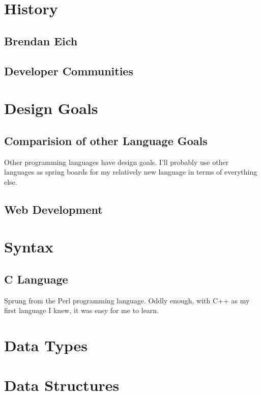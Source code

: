 \documentclass[12pt]{scrreprt}
\begin{document}
\tableofcontents 

\chapter{History}

\section{Brendan Eich}

\section{Developer Communities}

\chapter{Design Goals}

	\section{Comparision of other Language Goals}

		Other programming languages have design goals. I'll probably use other languages as spring boards for my 
		relatively new language in terms of everything else.

	\section{Web Development}

\chapter{Syntax}

\section{C Language}

	Sprung from the Perl programming language. Oddly enough, with C++ as my first language I knew, it was easy for me to learn.

\chapter{Data Types}

\chapter{Data Structures}
\end{document}
